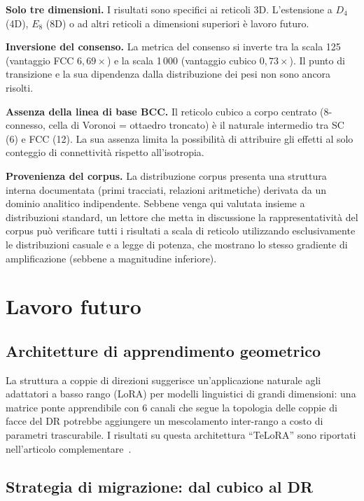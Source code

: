 \documentclass[11pt]{article}
\begin{document}
\textbf{Solo tre dimensioni.} I risultati sono specifici ai reticoli
3D. L'estensione a $D_4$ (4D), $E_8$ (8D) o ad altri reticoli a
dimensioni superiori \`e lavoro futuro.

\textbf{Inversione del consenso.} La metrica del consenso si inverte
tra la scala 125 (vantaggio FCC $6{,}69\times$) e la scala 1\,000
(vantaggio cubico $0{,}73\times$). Il punto di transizione e la sua
dipendenza dalla distribuzione dei pesi non sono ancora risolti.

\textbf{Assenza della linea di base BCC.} Il reticolo cubico a corpo
centrato (8-connesso, cella di Voronoi = ottaedro troncato) \`e il
naturale intermedio tra SC (6) e FCC (12). La sua assenza limita la
possibilit\`a di attribuire gli effetti al solo conteggio di
connettivit\`a rispetto all'isotropia.

\textbf{Provenienza del corpus.} La distribuzione corpus presenta una
struttura interna documentata (primi tracciati, relazioni aritmetiche)
derivata da un dominio analitico indipendente. Sebbene venga qui
valutata insieme a distribuzioni standard, un lettore che metta in
discussione la rappresentativit\`a del corpus pu\`o verificare tutti
i risultati a scala di reticolo utilizzando esclusivamente le
distribuzioni casuale e a legge di potenza, che mostrano lo stesso
gradiente di amplificazione (sebbene a magnitudine inferiore).

\section{Lavoro futuro}
\label{sec:future}

\subsection{Architetture di apprendimento geometrico}

La struttura a coppie di direzioni suggerisce un'applicazione naturale
agli adattatori a basso rango (LoRA) per modelli linguistici di grandi
dimensioni: una matrice ponte apprendibile con 6 canali che segue la
topologia delle coppie di facce del DR potrebbe aggiungere un
mescolamento inter-rango a costo di parametri trascurabile. I risultati
su questa architettura ``TeLoRA'' sono riportati nell'articolo
complementare~\cite{bielec2026bridge}.

\subsection{Strategia di migrazione: dal cubico al DR}
\label{sec:migration}
\end{document}
